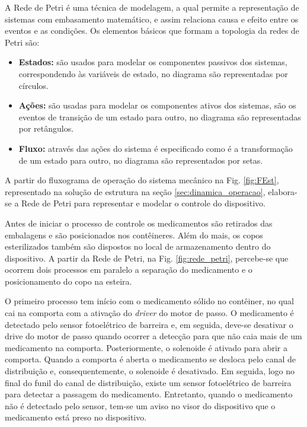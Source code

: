 A Rede de Petri é uma técnica de modelagem, a qual permite a representação de sistemas com embasamento matemático, e assim relaciona causa e efeito entre os eventos e as condições. Os elementos básicos que formam a topologia da redes de Petri são:
\begin{itemize}
    \item \textbf{Estados:} são usados para modelar os componentes passivos dos sistemas, correspondendo às variáveis de estado, no diagrama são representadas por círculos.
    \item \textbf{Ações:} são usadas para modelar os componentes ativos dos sistemas, são 
    os eventos de transição de um estado para outro, no diagrama são representadas por retângulos.
    \item \textbf{Fluxo:} através das ações do sistema é especificado como é a transformação de um estado para outro, no diagrama são representados por setas.
\end{itemize}

A partir do fluxograma de operação do sistema mecânico na Fig. \ref{fig:FEst}, representado na solução de estrutura na seção \ref{sec:dinamica_operacao}, elabora-se a Rede de Petri para representar e modelar o controle do dispositivo. 

Antes de iniciar o processo de controle os medicamentos são retirados das embalagens e são posicionados nos contêineres. Além do mais, os copos esterilizados também são dispostos no local de armazenamento dentro do dispositivo. A partir da Rede de Petri, na Fig. \ref{fig:rede_petri},  percebe-se que ocorrem dois processos em paralelo a separação do medicamento e o posicionamento do copo na esteira. 

O primeiro processo tem início com o medicamento sólido no contêiner, no qual cai na comporta com a ativação do \textit{driver} do motor de passo. O medicamento é detectado pelo sensor fotoelétrico de barreira e, em seguida, deve-se desativar o drive do motor de passo quando ocorrer a detecção para que não caia mais de um medicamento na comporta. Posteriormente, o solenoide é ativado para abrir a comporta. Quando a comporta é aberta o medicamento se desloca pelo canal de distribuição e, consequentemente, o solenoide é desativado. Em seguida, logo no final do funil do canal de distribuição, existe um sensor fotoelétrico de barreira para detectar a passagem do medicamento. Entretanto, quando o medicamento não é detectado pelo sensor, tem-se um aviso no visor do dispositivo que o medicamento está preso no dispositivo.

